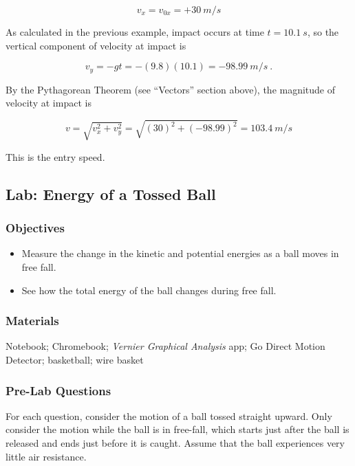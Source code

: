 \documentclass{article}
\begin{document}
\begin{equation*}
    v_x = v_{0x} = +\SI{30}{m/s}
\end{equation*}

As calculated in the previous example, impact occurs at time $t=\SI{10.1}{s}$, so the vertical component of velocity at impact is

\begin{equation*}
    v_y = - g t =  - (9.8)(10.1) = \SI{-98.99}{m/s}\ .
\end{equation*}

By the Pythagorean Theorem (see ``Vectors'' section above), the magnitude of velocity at impact is

\begin{equation*}
    v = \sqrt{v_x^2 + v_y^2}
    = \sqrt{\left(30\right)^2 + \left(-98.99\right)^2}
    = \SI{103.4}{m/s}
\end{equation*}

This is the entry speed.


\subsection{Lab: Energy of a Tossed Ball}

\subsubsection*{Objectives}

\begin{itemize}
\setlength\itemsep{-1ex}
    \item Measure the change in the kinetic and potential energies as a ball moves in free fall.
    \item See how the total energy of the ball changes during free fall.
\end{itemize}

\subsubsection*{Materials}

Notebook; Chromebook; \textit{Vernier Graphical Analysis} app; Go Direct Motion Detector; basketball; wire basket

\subsubsection*{Pre-Lab Questions}
For each question, consider the motion of a ball tossed straight upward. Only consider the motion while the ball is in free-fall, which starts just after the ball is released and ends just before it is caught. Assume that the ball experiences very little air resistance.
\end{document}
